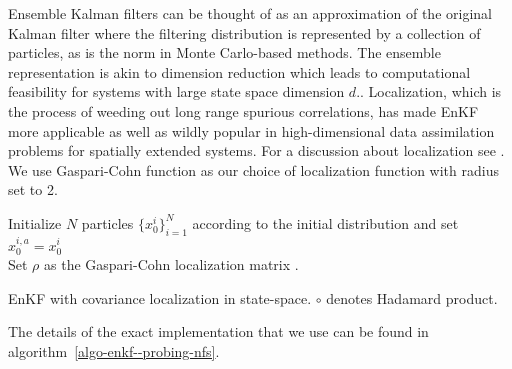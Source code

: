 Ensemble Kalman filters can be thought of as an approximation of the original Kalman filter where the filtering distribution is represented by a collection of particles, as is the norm in Monte Carlo-based methods. The ensemble representation is akin to  dimension reduction which leads to computational feasibility for systems with large state space dimension $d$.\cite{Evensen03}. Localization, which is the process of weeding out long range spurious correlations, has made EnKF more applicable as well as wildly popular in high-dimensional data assimilation problems for spatially extended systems. For a discussion about localization see \cite{carrassi2018data}. We use Gaspari-Cohn function as our choice of localization function {\color{mypink}with radius set to 2}. 
\begin{algorithm}[!t]
\textcolor{mypink}{Initialize $N$ particles $\{x_0^i\}_{i=1}^N$ according to the initial distribution and set $x_0^{i,a}=x_0^i$ \\
Set $\rho$ as the Gaspari-Cohn localization matrix \cite{carrassi2018data}.\\
\caption{EnKF with covariance localization in state-space. $\circ$ denotes Hadamard product.}
\label{algo-enkf--probing-nfs} 
}
\end{algorithm}
{\color{mypink} The details of the exact implementation that we use can be found in algorithm~\ref{algo-enkf--probing-nfs}.}


